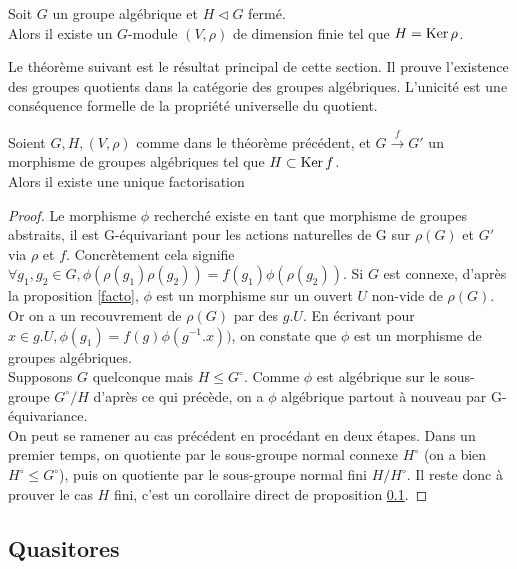 \begin{thm}
Soit $G$ un groupe algébrique et $H\lhd G$ fermé. \\Alors il existe un $G$-module $(V, \rho)$ de dimension finie tel que $H=\operatorname{Ker}{\rho}$.
\end{thm}
Le théorème suivant est le résultat principal de cette section. Il prouve l'existence des groupes quotients dans la catégorie des groupes algébriques. L'unicité est une conséquence formelle de la propriété universelle du quotient.
\begin{thm}[Car. 0]
Soient $G, H, (V, \rho)$ comme dans le théorème précédent, et $G \xrightarrow{f} G'$ un morphisme de groupes algébriques tel que $H\subset \operatorname{Ker} f$.\\
Alors il existe une unique factorisation 	
\end{thm}
\begin{proof}
	Le morphisme $\phi$ recherché existe en tant que morphisme de groupes abstraits, il est G-équivariant pour les actions naturelles de G sur $\rho(G)$ et $G'$ via $\rho$ et $f$. Concrètement cela signifie $\forall g_1, g_2 \in G, \phi(\rho(g_1)\rho(g_2))=f(g_1)\phi(\rho(g_2))$. Si $G$ est connexe, d'après la proposition \ref{facto}, $\phi$ est un morphisme sur un ouvert $U$ non-vide de $\rho(G)$. Or on a un recouvrement de $\rho(G)$ par des $g.U$. En écrivant pour $x\in g.U,  \phi(g_1)=f(g)\phi(g^{-1}.x))$, on constate que $\phi$ est un morphisme de groupes algébriques.
	\\Supposons $G$ quelconque mais $H\leq G^\circ$. Comme $\phi$ est algébrique sur le sous-groupe $G^\circ/H$ d'après ce qui précède, on a $\phi$ algébrique partout à nouveau par G-équivariance.\\
	On peut se ramener au cas précédent en procédant en deux étapes. Dans un premier temps, on quotiente par le sous-groupe normal connexe $H^\circ$ (on a bien $H^\circ\leq G^\circ$), puis on quotiente par le sous-groupe normal fini $H/H^\circ$. Il reste donc à prouver le cas $H$ fini, c'est un corollaire direct de proposition \ref{}.
	\end{proof}
\subsection{Quasitores}
